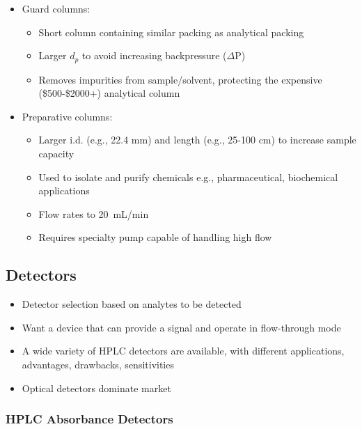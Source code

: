 \documentclass[a4paper, 12pt]{article}
\begin{document}
\begin{itemize}
	\item Guard columns:
	\begin{itemize}
		\item Short column containing similar packing as analytical packing
		\item Larger $d_p$ to avoid increasing backpressure ($\Delta$P)
		\item Removes impurities from sample/solvent, protecting the expensive (\$500-\$2000+) analytical column
	\end{itemize}
	\item Preparative columns:
	\begin{itemize}
		\item Larger i.d. (e.g., 22.4 mm) and length (e.g., 25-100 cm) to increase sample capacity
		\item Used to isolate and purify chemicals e.g., pharmaceutical, biochemical applications
		\item Flow rates to \SI{20}{mL/min}
		\item Requires specialty pump capable of handling high flow
	\end{itemize}
\end{itemize}


\subsection{Detectors}

\begin{itemize}
	\item Detector selection based on analytes to be detected
	\item Want a device that can provide a signal and operate in flow-through mode
	\item A wide variety of HPLC detectors are available, with different applications, advantages, drawbacks, sensitivities
	\item Optical detectors dominate market
\end{itemize}

\subsubsection{HPLC Absorbance Detectors}
\end{document}
